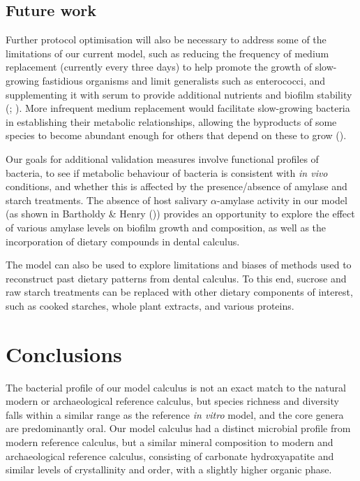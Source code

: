 \documentclass[
  b5paper,
]{book}
\begin{document}
\subsection{Future work}\label{future-work}

Further protocol optimisation will also be necessary to address some of
the limitations of our current model, such as reducing the frequency of
medium replacement (currently every three days) to help promote the
growth of slow-growing fastidious organisms and limit generalists such
as enterococci, and supplementing it with serum to provide additional
nutrients and biofilm stability
(;
). More infrequent
medium replacement would facilitate slow-growing bacteria in
establishing their metabolic relationships, allowing the byproducts of
some species to become abundant enough for others that depend on these
to grow ().

Our goals for additional validation measures involve functional profiles
of bacteria, to see if metabolic behaviour of bacteria is consistent
with \emph{in vivo} conditions, and whether this is affected by the
presence/absence of amylase and starch treatments. The absence of host
salivary \(\alpha\)-amylase activity in our model (as shown in Bartholdy
\& Henry ())
provides an opportunity to explore the effect of various amylase levels
on biofilm growth and composition, as well as the incorporation of
dietary compounds in dental calculus.

The model can also be used to explore limitations and biases of methods
used to reconstruct past dietary patterns from dental calculus. To this
end, sucrose and raw starch treatments can be replaced with other
dietary components of interest, such as cooked starches, whole plant
extracts, and various proteins.

\section{Conclusions}\label{conclusions}

The bacterial profile of our model calculus is not an exact match to the
natural modern or archaeological reference calculus, but species
richness and diversity falls within a similar range as the reference
\emph{in vitro} model, and the core genera are predominantly oral. Our
model calculus had a distinct microbial profile from modern reference
calculus, but a similar mineral composition to modern and archaeological
reference calculus, consisting of carbonate hydroxyapatite and similar
levels of crystallinity and order, with a slightly higher organic phase.
\end{document}
